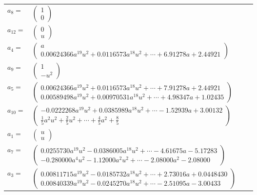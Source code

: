 \documentclass[1p]{elsarticle_modified}
\theoremstyle{definition}
\begin{document}
\begin{tabular}{m{7pt} m{180pt} m{7pt} m{180pt} }
\flushright $a_{8}=$&$\begin{pmatrix}1\\0\end{pmatrix}$ \\
\flushright $a_{12}=$&$\begin{pmatrix}0\\u\end{pmatrix}$ \\
\flushright $a_{4}=$&$\begin{pmatrix}a\\0.00624366 a^{19} u^{2}+0.0116573 a^{18} u^{2}+\cdots+6.91278 a+2.44921\end{pmatrix}$ \\
\flushright $a_{9}=$&$\begin{pmatrix}1\\- u^2\end{pmatrix}$ \\
\flushright $a_{5}=$&$\begin{pmatrix}0.00624366 a^{19} u^{2}+0.0116573 a^{18} u^{2}+\cdots+7.91278 a+2.44921\\0.00589498 a^{19} u^{2}+0.00970531 a^{18} u^{2}+\cdots+4.98347 a+1.02435\end{pmatrix}$ \\
\flushright $a_{10}=$&$\begin{pmatrix}-0.0222268 a^{19} u^{2}+0.0385989 a^{18} u^{2}+\cdots-1.52939 a+3.00132\\\frac{1}{5} a^2 u^2+\frac{2}{5} u^2+\cdots+\frac{4}{5} a^2+\frac{8}{5}\end{pmatrix}$ \\
\flushright $a_{1}=$&$\begin{pmatrix}u\\u\end{pmatrix}$ \\
\flushright $a_{7}=$&$\begin{pmatrix}0.0255730 a^{19} u^{2}-0.0386005 a^{18} u^{2}+\cdots-4.61675 a-5.17283\\-0.280000 a^{4} u^{2}-1.12000 a^{2} u^{2}+\cdots-2.08000 a^{2}-2.08000\end{pmatrix}$ \\
\flushright $a_{3}=$&$\begin{pmatrix}0.00811715 a^{19} u^{2}-0.0185732 a^{18} u^{2}+\cdots+2.73016 a+0.0448430\\0.00840339 a^{19} u^{2}-0.0245270 a^{18} u^{2}+\cdots-2.51095 a-3.00433\end{pmatrix}$ \\

\end{tabular}
\end{document}
